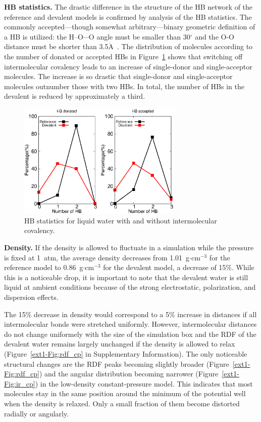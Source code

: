 \documentclass[journal=jacsat,manuscript=article]{achemso}
\newcommand{\Ang}{\ensuremath{\mathring{\text{A}}}}
\begin{document}
\textbf{HB statistics.} The drastic difference in the structure of the HB network of the reference and devalent models is confirmed by analysis of the HB statistics. 
The commonly accepted---though somewhat arbitrary---binary geometric definition of a HB is utilized: the H--O$\cdots$O angle must be smaller than 30$^{\circ}$ and the O-O distance must be shorter than 3.5\Ang~\cite{rey2002hydrogen,lawrence2003vibrational}. 
The distribution of molecules according to the number of donated or accepted HBs in Figure~\ref{fig:HBstat} shows that switching off intermolecular covalency leads to an increase of single-donor and single-acceptor molecules. 
The increase is so drastic that single-donor and single-acceptor molecules outnumber those with two HBs.
In total, the number of HBs in the devalent is reduced by approximately a third.

\begin{figure}
\includegraphics[width=0.7\textwidth]{new_hbstat}
\caption{HB statistics for liquid water with and without intermolecular covalency.}\label{fig:HBstat}
\end{figure}

\textbf{Density.} If the density is allowed to fluctuate in a simulation while the pressure is fixed at 1~atm, the average density decreases from 1.01~g$\cdot$cm$^{-3}$ for the reference model to 0.86~g$\cdot$cm$^{-3}$ for the devalent model, a decrease of 15\%. 
While this is a noticeable drop, it is important to note that the devalent water is still liquid at ambient conditions because of the strong electrostatic, polarization, and dispersion effects. 

The 15\% decrease in density would correspond to a 5\% increase in distances if all intermolecular bonds were stretched uniformly. 
However, intermolecular distances do not change uniformely with the size of the simulation box and the RDF of the devalent water remains largely unchanged if the density is allowed to relax (Figure~\ref{ext1-Fig:rdf_cp} in Supplementary Information). 
The only noticeable structural changes are the RDF peaks becoming slightly broader (Figure~\ref{ext1-Fig:rdf_cp}) and the angular distribution becoming narrower (Figure~\ref{ext1-Fig:ir_cp}) in the low-density constant-pressure model. 
This indicates that most molecules stay in the same position around the minimum of the potential well when the density is relaxed. 
Only a small fraction of them become distorted radially or angularly. 
\end{document}
